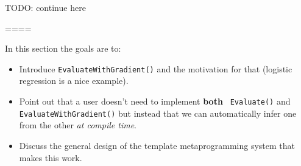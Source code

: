 TODO: continue here

====

In this section the goals are to:

\begin{itemize}
  \item Introduce {\tt EvaluateWithGradient()} and the motivation for that
(logistic regression is a nice example).

  \item Point out that a user doesn't need to implement {\bf both} {\tt
Evaluate()} and {\tt EvaluateWithGradient()} but instead that we can
automatically infer one from the other {\it at compile time}.

  \item Discuss the general design of the template metaprogramming system that
makes this work.
\end{itemize}

